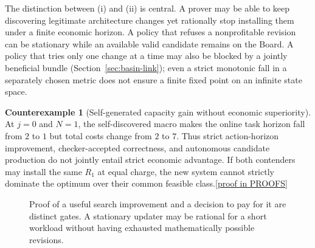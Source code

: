 \documentclass[11pt,letterpaper]{article}
\theoremstyle{definition}
\newtheorem{counterexample}[theorem]{Counterexample}
\theoremstyle{remark}
\newcommand{\prooflink}[1]{\hfill\hyperlink{proof:#1}{\footnotesize[proof in PROOFS]}}
\begin{document}
The distinction between (i) and (ii) is central. A prover may be able to keep discovering legitimate architecture changes yet rationally stop installing them under a finite economic horizon. A policy that refuses a nonprofitable revision can be stationary while an available valid candidate remains on the Board. A policy that tries only one change at a time may also be blocked by a jointly beneficial bundle (Section~\ref{sec:basin-link}); even a strict monotonic fall in a separately chosen metric does not ensure a finite fixed point on an infinite state space.

\begin{counterexample}[Self-generated capacity gain without economic superiority]\label{cex:costgap}\hypertarget{claim:costgap}{}
At $j=0$ and $N=1$, the self-discovered macro makes the online task horizon fall from $2$ to $1$ but total costs change from $2$ to $7$. Thus strict action-horizon improvement, checker-accepted correctness, and autonomous candidate production do not jointly entail strict economic advantage. If both contenders may install the same $R_1$ at equal charge, the new system cannot strictly dominate the optimum over their common feasible class.\prooflink{costgap}
\end{counterexample}

\begin{figure}[htbp]\centering
{}
\caption{Proof of a useful search improvement and a decision to pay for it are distinct gates. A stationary updater may be rational for a short workload without having exhausted mathematically possible revisions.}
\end{figure}
\end{document}
